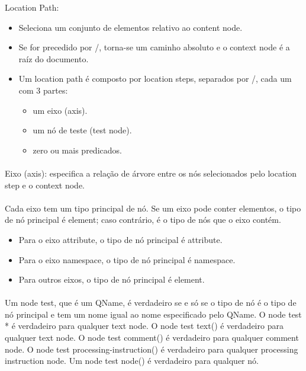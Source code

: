 \documentclass[../resumosLTW.tex]{subfiles}
\begin{document}
Location Path:
\begin{itemize}
    \item Seleciona um conjunto de elementos relativo ao content node.
    \item Se for precedido por /, torna-se um caminho absoluto e o context node é a raíz do documento.
    \item Um location path é composto por location steps, separados por /, cada um com 3 partes:
    \begin{itemize}
        \item um eixo (axis).
        \item um nó de teste (test node).
        \item zero ou mais predicados.
    \end{itemize}
\end{itemize}

\paragraph{}

Eixo (axis): especifica a relação de árvore entre os nós selecionados pelo location step e o context node.

\paragraph{}

Cada eixo tem um tipo principal de nó. 
Se um eixo pode conter elementos, o tipo de nó principal é element; caso contrário, é o tipo de nós que o eixo contém.
\begin{itemize}
    \item Para o eixo attribute, o tipo de nó principal é attribute.
    \item Para o eixo namespace, o tipo de nó principal é namespace.
    \item Para outros eixos, o tipo de nó principal é element.
\end{itemize}

\paragraph{}

Um node test, que é um QName, é verdadeiro se e só se o tipo de nó é o tipo de nó principal e tem um nome igual ao nome especificado pelo QName.
O node test * é verdadeiro para qualquer text node.
O node test text() é verdadeiro para qualquer text node.
O node test comment() é verdadeiro para qualquer comment node.
O node test processing-instruction() é verdadeiro para qualquer processing instruction node.
Um node test node() é verdadeiro para qualquer nó.
\end{document}
